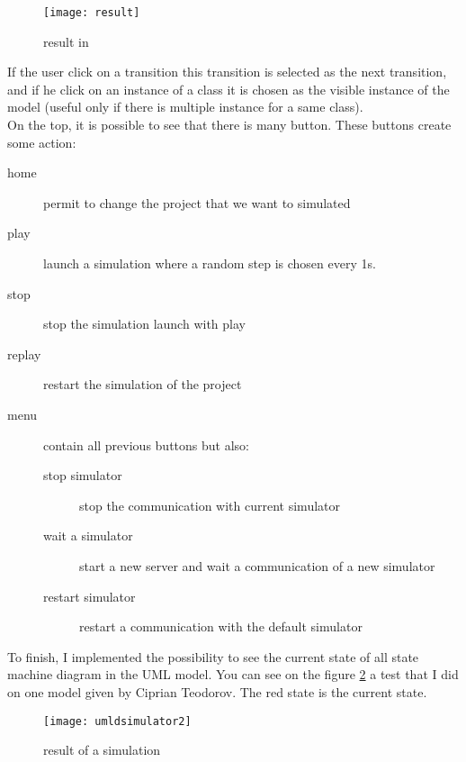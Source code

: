 \begin{figure}[h]
  \centering
  \texttt{[image: result]}
  \caption{result in \umld}
  \label{fig:result}
\end{figure}

If the user click on a transition this transition is selected as the next transition, and if he click on an instance of a class it is chosen as the visible instance of the model (useful only if there is multiple instance for a same class).
~\\

On the top, it is possible to see that there is many button. These buttons create some action:

\noitemsep
\begin{description}
\item[home] permit to change the project that we want to simulated
\item[play] launch a simulation where a random step is chosen every 1s.
\item[stop] stop the simulation launch with play
\item[replay] restart the simulation of the project
\item[menu] contain all previous buttons but also:
  \begin{description}
  \item[stop simulator] stop the communication with current simulator
  \item[wait a simulator] start a new server and wait a communication of a new simulator
  \item[restart simulator] restart a communication with the default simulator
  \end{description}
\end{description}
\doitemsep


To finish, I implemented the possibility to see the current state of all state machine diagram in the UML model. You can see on the figure \ref{fig:result2} a test that I did on one model given by Ciprian Teodorov. The red state is the current state.

\begin{figure}[h]
  \centering
  \texttt{[image: umldsimulator2]}
  \caption{result of a simulation}
  \label{fig:result2}
\end{figure}








